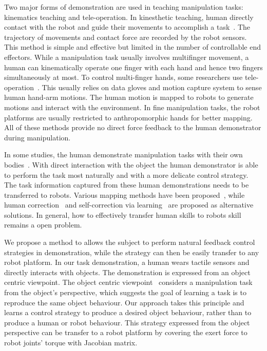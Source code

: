Two major forms of demonstration are used in teaching manipulation tasks: kinematics teaching and tele-operation. In kinesthetic teaching, human directly contact with the robot and guide their movements to accomplish a task~\cite{korkinof2013online,pais2014encoding,pastor2011skill,Miao2014}. The trajectory of movements and contact force are recorded by the robot sensors.
This method is simple and effective but limited in the number of controllable end effectors. While a manipulation task usually involves multifinger movement, a human can kinematically operate one finger with each hand and hence two fingers simultaneously at most. To control multi-finger hands, some researchers use tele-operation~\cite{bernardino2013precision,kondo2008recognition,Fischer98}. This usually relies on data gloves and motion capture system to sense human hand-arm motions. The human motion is mapped to robots to generate motions and interact with the environment. In fine manipulation tasks, the robot platforms are usually restricted to anthropomorphic hands for better mapping. All of these methods provide no direct force feedback to the human demonstrator during manipulation.

In some studies, the human demonstrate manipulation tasks with their own bodies~\cite{asfour2008imitation}. With direct interaction with the object the human demonstrator is able to perform the task most naturally and with a more delicate control strategy. The task information captured from these human demonstrations needs to be transferred to robots. Various mapping methods have been proposed~\cite{do2011towards,asfour2008imitation,hueser2006learning}, while human correction~\cite{calinon2007incremental,sauser2011iterative,romano2011human} and self-correction via learning~\cite{bidan2013robio} are proposed as alternative solutions. In general, how to effectively transfer human skills to robots skill remains a open problem.

We propose a method to allows the subject to perform natural feedback control strategies in demonstration, while the strategy can then be easily transfer to any robot platform. In our task demonstration, a human wears tactile sensors and directly interacts with objects. The demonstration is expressed from an object centric viewpoint. The object centric viewpoint~\cite{okamura2000overview,Miao2014} considers a manipulation task from the object's perspective, which suggests the goal of learning a task is to reproduce the same object behaviour. Our approach takes this principle and learns a control strategy to produce a desired object behaviour, rather than to produce a human or robot behaviour. This strategy expressed from the object perspective can be transfer to a robot platform by covering the exert force to robot joints' torque with Jacobian matrix.

